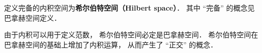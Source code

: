 

定义完备的内积空间为\textbf{希尔伯特空间（Hilbert space）}． 其中 “完备” 的概念见巴拿赫空间定义．

由于内积可以用于定义范数， 希尔伯特空间必定是巴拿赫空间． 希尔伯特空间在巴拿赫空间的基础上增加了内积运算， 从而产生了 “正交” 的概念．
